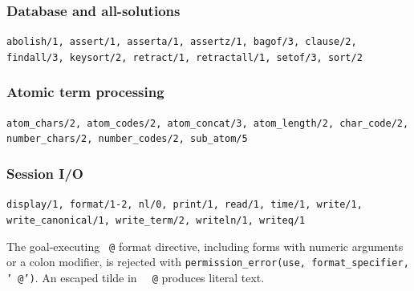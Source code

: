 \subsubsection*{Database and all-solutions}\vspace{-2mm}
{\raggedright \texttt{abolish/\allowbreak{}1,\allowbreak{} assert/\allowbreak{}1,\allowbreak{} asserta/\allowbreak{}1,\allowbreak{} assertz/\allowbreak{}1,\allowbreak{} bagof/\allowbreak{}3,\allowbreak{} clause/\allowbreak{}2,\allowbreak{} findall/\allowbreak{}3,\allowbreak{} keysort/\allowbreak{}2,\allowbreak{} retract/\allowbreak{}1,\allowbreak{} retractall/\allowbreak{}1,\allowbreak{} setof/\allowbreak{}3,\allowbreak{} sort/\allowbreak{}2}\par}
\vspace{-4mm}
\subsubsection*{Atomic term processing}\vspace{-2mm}
{\raggedright \texttt{atom\_\allowbreak{}chars/\allowbreak{}2,\allowbreak{} atom\_\allowbreak{}codes/\allowbreak{}2,\allowbreak{} atom\_\allowbreak{}concat/\allowbreak{}3,\allowbreak{} atom\_\allowbreak{}length/\allowbreak{}2,\allowbreak{} char\_\allowbreak{}code/\allowbreak{}2,\allowbreak{} number\_\allowbreak{}chars/\allowbreak{}2,\allowbreak{} number\_\allowbreak{}codes/\allowbreak{}2,\allowbreak{} sub\_\allowbreak{}atom/\allowbreak{}5}\par}
\vspace{-4mm}
\subsubsection*{Session I/O}\vspace{-2mm}
{\raggedright \texttt{display/\allowbreak{}1,\allowbreak{} format/\allowbreak{}1-2,\allowbreak{} nl/\allowbreak{}0,\allowbreak{} print/\allowbreak{}1,\allowbreak{} read/\allowbreak{}1,\allowbreak{} time/\allowbreak{}1,\allowbreak{} write/\allowbreak{}1,\allowbreak{} write\_\allowbreak{}canonical/\allowbreak{}1,\allowbreak{} write\_\allowbreak{}term/\allowbreak{}2,\allowbreak{} writeln/\allowbreak{}1,\allowbreak{} writeq/\allowbreak{}1}\par}

\noindent The goal-executing \texttt{\string~@} format directive, including
forms with numeric arguments or a colon modifier, is rejected with
\texttt{permission\_\allowbreak{}error(\allowbreak{}use,\allowbreak{} format\_\allowbreak{}specifier,\allowbreak{} '\string~@')}.
An escaped tilde in \texttt{\string~\string~@} produces literal text.

